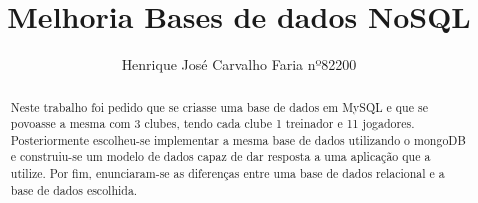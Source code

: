 %
\title{Melhoria Bases de dados NoSQL}
%
%
\author{ Henrique José Carvalho Faria nº82200 }
%
%
%
\maketitle              %
%
\begin{abstract}


Neste trabalho foi pedido que se criasse uma base de dados em MySQL e que se povoasse a mesma com 3 clubes, tendo cada clube 1 treinador e 11 jogadores. Posteriormente escolheu-se implementar a mesma base de dados utilizando o mongoDB e construiu-se um modelo de dados capaz de dar resposta a uma aplicação que a utilize. Por fim, enunciaram-se as diferenças entre uma base de dados relacional e a base de dados escolhida.


\end{abstract}
%
%
